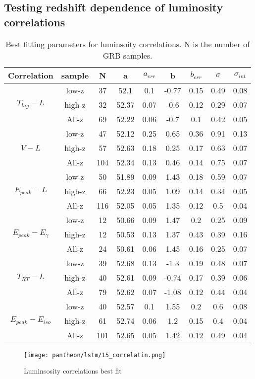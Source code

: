 \subsection{Testing redshift dependence of luminosity correlations}
\begin{table}[H]
\centering
\begin{tabular}{|c|c|c|c|c|c|c|c|c|}
\hline
Correlation & sample & N & a & $a_{err}$ & b & $b_{err}$ & $\sigma$ & $\sigma_{int}$\\
\hline
\multirow{3}{*}{$T_{lag}-L$} & low-z & 37 & 52.1 & 0.1 & -0.77 & 0.15 & 0.49 & 0.08\\
\cline{2-9}
 & high-z & 32 & 52.37 & 0.07 & -0.6 & 0.12 & 0.29 & 0.07\\
\cline{2-9}
 & All-z & 69 & 52.22 & 0.06 & -0.7 & 0.1 & 0.42 & 0.05\\
\hline
\multirow{3}{*}{$V-L$} & low-z & 47 & 52.12 & 0.25 & 0.65 & 0.36 & 0.91 & 0.13\\
\cline{2-9}
 & high-z & 57 & 52.63 & 0.18 & 0.25 & 0.17 & 0.63 & 0.07\\
\cline{2-9}
 & All-z & 104 & 52.34 & 0.13 & 0.46 & 0.14 & 0.75 & 0.07\\
\hline
\multirow{3}{*}{$E_{peak}-L$} & low-z & 50 & 51.89 & 0.09 & 1.43 & 0.18 & 0.59 & 0.07\\
\cline{2-9}
 & high-z & 66 & 52.23 & 0.05 & 1.09 & 0.14 & 0.34 & 0.05\\
\cline{2-9}
 & All-z & 116 & 52.05 & 0.05 & 1.35 & 0.12 & 0.5 & 0.04\\
\hline
\multirow{3}{*}{$E_{peak}-E_{\gamma}$} & low-z & 12 & 50.66 & 0.09 & 1.47 & 0.2 & 0.25 & 0.09\\
\cline{2-9}
 & high-z & 12 & 50.53 & 0.13 & 1.37 & 0.43 & 0.39 & 0.16\\
\cline{2-9}
 & All-z & 24 & 50.61 & 0.06 & 1.45 & 0.16 & 0.25 & 0.07\\
\hline
\multirow{3}{*}{$T_{RT}-L$} & low-z & 39 & 52.68 & 0.13 & -1.3 & 0.19 & 0.48 & 0.07\\
\cline{2-9}
 & high-z & 40 & 52.61 & 0.09 & -0.74 & 0.17 & 0.39 & 0.06\\
\cline{2-9}
 & All-z & 79 & 52.62 & 0.07 & -1.08 & 0.12 & 0.44 & 0.04\\
\hline
\multirow{3}{*}{$E_{peak}-E_{iso}$} & low-z & 40 & 52.57 & 0.1 & 1.55 & 0.2 & 0.6 & 0.08\\
\cline{2-9}
 & high-z & 61 & 52.74 & 0.06 & 1.2 & 0.15 & 0.4 & 0.04\\
\cline{2-9}
 & All-z & 101 & 52.65 & 0.05 & 1.42 & 0.12 & 0.49 & 0.04\\
\hline
\end{tabular}
\caption{Best fitting parameters for luminsoity correlations. N is the number of GRB samples.}
\label{table_pantheon_lstm}
\end{table}


\begin{figure}[H]
	\centering
	\texttt{[image: pantheon/lstm/15\_correlatin.png]}
	\caption{Luminsosity correlations best fit}
	\label{fig:correlation_lstm}
\end{figure}

